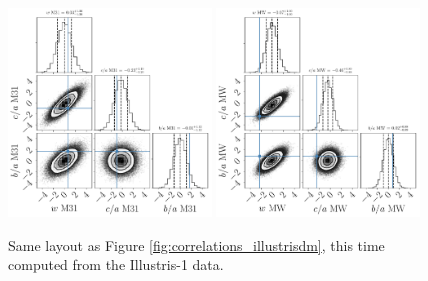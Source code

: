 \documentclass[a4paper,fleqn,usenatbib]{mnras}
\begin{document}
\begin{figure}
\centering
\includegraphics[width=0.48\textwidth]{gaussian_model_illustris1_M31_n_11.pdf}
\includegraphics[width=0.48\textwidth]{gaussian_model_illustris1_MW_n_11.pdf}
\caption{
Same layout as Figure \ref{fig:correlations_illustrisdm}, this time
computed from the Illustris-1 data.
\label{fig:correlations_illustris}}
\end{figure}
\end{document}
